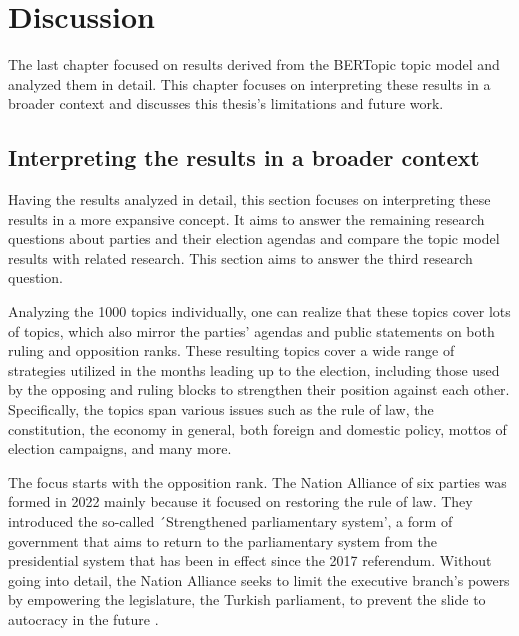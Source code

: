 
\chapter{Discussion}\label{chapter:discussion}

The last chapter focused on results derived from the BERTopic topic model and analyzed them in 
detail. This chapter focuses on interpreting these results in a broader context and discusses this
thesis's limitations and future work. 

\section{Interpreting the results in a broader context}

Having the results analyzed in detail, this section focuses on interpreting these results in a more 
expansive concept. It aims to answer the remaining research questions about parties and their election 
agendas and compare the topic model results with related research. This section aims to answer the third 
research question.

Analyzing the 1000 topics individually, one can realize that these topics cover lots of topics, 
which also mirror the parties' agendas and public statements on both ruling and opposition ranks. 
These resulting topics cover a wide range of strategies utilized in the months leading up to the 
election, including those used by the opposing and ruling blocks to strengthen their position against each 
other. Specifically, the topics span various issues such as the rule of law, the constitution, the 
economy in general, both foreign and domestic policy, mottos of election campaigns, and many more.

The focus starts with the opposition rank. The Nation Alliance of six parties was formed in 
2022 mainly because it focused on restoring the rule of law. They introduced the so-called 
´Strengthened parliamentary system', a form of government that aims to return to the parliamentary system 
from the presidential system that has been in effect since the 2017 referendum. Without going into detail, 
the Nation Alliance seeks to limit the executive branch's powers by empowering the legislature, the 
Turkish parliament, to prevent the slide to autocracy in the future \parencite{edgar_sar_opposition_election_agenda_2023}.

